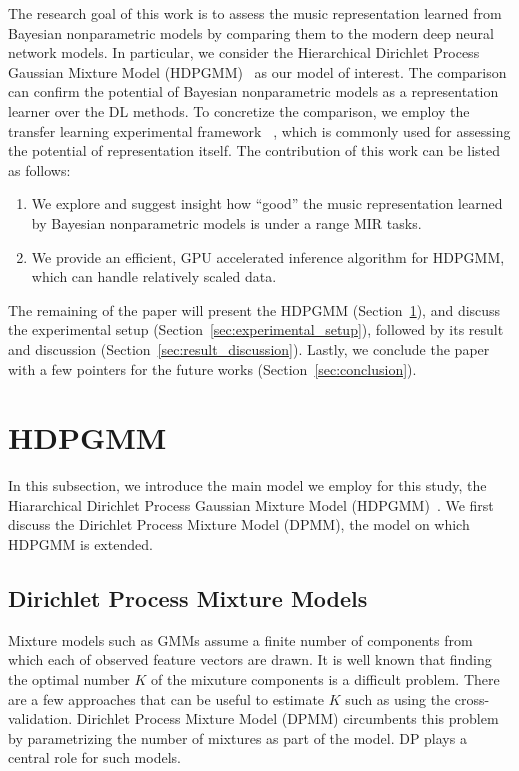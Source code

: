 \documentclass{article}
\begin{document}
The research goal of this work is to assess the music representation learned from Bayesian nonparametric models by comparing them to the modern deep neural network models. In particular, we consider the Hierarchical Dirichlet Process Gaussian Mixture Model (HDPGMM)~\cite{DBLP:journals/jmlr/WangPB11,DBLP:conf/ismir/YoshiiG09,doi:10.1198/016214506000000302} as our model of interest. The comparison can confirm the potential of Bayesian nonparametric models as a representation learner over the DL methods.
To concretize the comparison, we employ the transfer learning experimental framework
~\cite{DBLP:journals/nca/KimULH20, DBLP:conf/ismir/ChoiFSC17, DBLP:conf/ismir/DielemanBS11}, which is commonly used for assessing the potential of representation itself. The contribution of this work can be listed as follows:

\begin{enumerate}
    \item We explore and suggest insight how ``good'' the music representation learned by Bayesian nonparametric models is under a range MIR tasks.
    \item We provide an efficient, GPU accelerated inference algorithm for HDPGMM, which can handle relatively scaled data.
\end{enumerate}

The remaining of the paper will present the HDPGMM (Section~\ref{sec:hdpgmm}), and discuss the experimental setup (Section~\ref{sec:experimental_setup}), followed by its result and discussion (Section~\ref{sec:result_discussion}). Lastly, we conclude the paper with a few pointers for the future works (Section~\ref{sec:conclusion}).


\section{HDPGMM}\label{sec:hdpgmm}

In this subsection, we introduce the main model we employ for this study, the Hiararchical Dirichlet Process Gaussian Mixture Model (HDPGMM)~\cite{DBLP:conf/ismir/HoffmanBC08, doi:10.1198/016214506000000302}. We first discuss the Dirichlet Process Mixture Model (DPMM), the model on which HDPGMM is extended.

\subsection{Dirichlet Process Mixture Models}\label{sec:hdpgmm:dpmm}

Mixture models such as GMMs assume a finite number of components from which each of observed feature vectors are drawn. It is well known that finding the optimal number $K$ of the mixuture components is a difficult problem. There are a few approaches that can be useful to estimate $K$ such as using the cross-validation. Dirichlet Process Mixture Model (DPMM) circumbents this problem by parametrizing the number of mixtures as part of the model. DP plays a central role for such models.
\end{document}
